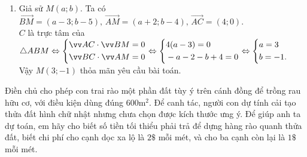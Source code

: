 \begin{bt}
{\begin{enumerate}
Vậy $H(3;4)$ thỏa mãn yêu cầu bài toán.
\item Giả sử $M(a;b)$. Ta có $\overrightarrow{BM}=(a-3; b-5),\, \overrightarrow{AM}=(a+2;b-4),\, \overrightarrow{AC}=(4;0)$.\\
$C$ là trực tâm của $\triangle ABM \Leftrightarrow \heva{&\overrightarrow{AC} \cdot \overrightarrow{BM}=0\\&\overrightarrow{BC} \cdot \overrightarrow{AM}=0} \Leftrightarrow \heva{&4(a-3)=0\\&-a-2-b+4=0} \Leftrightarrow \heva{&a=3\\&b=-1.}$\\
Vậy $M(3;-1)$ thỏa mãn yêu cầu bài toán.
\end{enumerate}
}
\end{bt}

\begin{bt}%
Điền chủ cho phép con trai rào một phần đất tùy ý trên cánh đồng để trồng rau hữu cơ, với điều kiện dùng đúng $600 \mathrm{m}^2$. Để canh tác, người con dự tính cải tạo thửa đất hình chữ nhật nhưng chưa chọn được kích thước ưng ý. Để giúp anh ta dự toán, em hãy cho biết số tiền tối thiểu phải trả để dựng hàng rào quanh thửa đất, biết chi phí cho cạnh dọc xa lộ là $ 2\mathdollar $ mỗi mét, và cho ba cạnh còn lại là $1\$ $ mỗi mét.
\end{bt}
